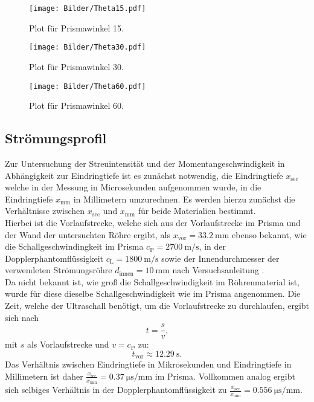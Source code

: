 \begin{figure}
	\centering
	\texttt{[image: Bilder/Theta15.pdf]}
	\caption{Plot für Prismawinkel 15.}
	\label{fig:Theta15}
\end{figure}
\begin{figure}
	\centering
	\texttt{[image: Bilder/Theta30.pdf]}
	\caption{Plot für Prismawinkel 30.}
	\label{fig:Theta30}
\end{figure}

\begin{figure}
	\centering
	\texttt{[image: Bilder/Theta60.pdf]}
	\caption{Plot für Prismawinkel 60.}
	\label{fig:Theta60}
\end{figure}

\subsection{Strömungsprofil}
Zur Untersuchung der Streuintensität und der Momentangeschwindigkeit in Abhängigkeit zur Eindringtiefe ist es zunächst notwendig, die Eindringtiefe $x_{\mathrm{sec}}$ welche in der Messung in Microsekunden aufgenommen wurde, in die Eindringtiefe $x_{\mathrm{mm}}$ in Millimetern umzurechnen.
Es werden hierzu zunächst die Verhältnisse zwischen $x_{\mathrm{sec}}$ und $x_{\mathrm{mm}}$ für beide Materialien bestimmt.\\
Hierbei ist die Vorlaufstrecke, welche sich aus der Vorlaufstrecke im Prisma und der Wand der untersuchten Röhre ergibt, als $x_\mathrm{vor}=\SI{33.2}{\milli\meter}$ ebenso bekannt, wie die Schallgeschwindingkeit im Prisma $c_\mathrm{P}=\SI{2700}{\meter\per\second}$, in der Dopplerphantomflüssigkeit $c_\mathrm{L}=\SI{1800}{\meter\per\second}$ sowie der Innendurchmesser der verwendeten Strömungsröhre $d_\mathrm{innen}=\SI{10}{\milli\meter}$ nach Versuchsanleitung \cite{Anleitung}.\\
Da nicht bekannt ist, wie groß die Schallgeschwindigkeit im Röhrenmaterial ist, wurde für diese dieselbe Schallgeschwindigkeit wie im Prisma angenommen.
Die Zeit, welche der Ultraschall benötigt, um die Vorlaufstrecke zu durchlaufen, ergibt sich nach
\begin{equation*}
  t=\frac{s}{v} \text{,}
\end{equation*}
mit $s$ als Vorlaufstrecke und $v=c_\mathrm{P}$ zu:
\begin{equation*}
    t_\mathrm{vor}\approx\SI{12.29}{\second}\text{.}
\end{equation*}
Das Verhältnis zwischen Eindringtiefe in Mikrosekunden und Eindringtiefe in Millimetern ist daher $\frac{x_\mathrm{sec}}{x_\mathrm{mm}}=\SI{0.37}{\micro\second\per\milli\meter}$ im Prisma. Vollkommen analog ergibt sich selbiges Verhältnis in der Dopplerphantomflüssigkeit zu $\frac{x_\mathrm{sec}}{x_\mathrm{mm}}=\SI{0.556}{\micro\second\per\milli\meter}$.
